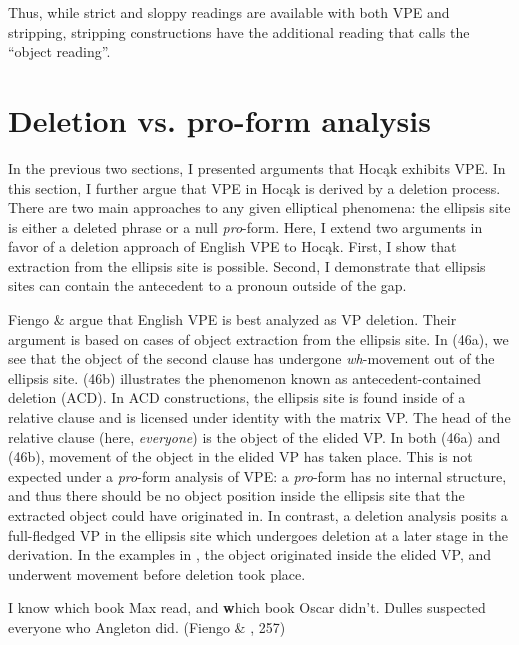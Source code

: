 \documentclass[output=paper]{LSP/langsci}
\begin{document}
Thus, while strict and sloppy readings are available with both VPE and stripping, stripping constructions have the additional reading that \citealt{Fortin2007} calls the ``object reading''.


\section{Deletion vs. pro-form analysis}

In the previous two sections, I presented arguments that Hocąk exhibits VPE. In this section, I further argue that VPE in Hocąk is derived by a deletion process. There are two main approaches to any given elliptical phenomena: the ellipsis site is either a deleted phrase or a null \emph{pro}-form. Here, I extend two arguments in favor of a deletion approach of English VPE to Hocąk. First, I show that extraction from the ellipsis site is possible. Second, I demonstrate that ellipsis sites can contain the antecedent to a pronoun outside of the gap.

Fiengo \& \citet{May1994} argue that English VPE is best analyzed as VP deletion. Their argument is based on cases of object extraction from the ellipsis site. In (46a), we see that the object of the second clause has undergone \emph{wh}-movement out of the ellipsis site. (46b) illustrates the phenomenon known as antecedent-contained deletion (ACD). In ACD constructions, the ellipsis site is found inside of a relative clause and is licensed under identity with the matrix VP. The head of the relative clause (here, \emph{everyone}) is the object of the elided VP. In both (46a) and (46b), movement of the object in the elided VP has taken place. This is not expected under a \emph{pro}-form analysis of VPE: a \emph{pro}-form has no internal structure, and thus there should be no object position inside the ellipsis site that the extracted object could have originated in. In contrast, a deletion analysis posits a full-fledged VP in the ellipsis site which undergoes deletion at a later stage in the derivation. In the examples in , the object originated inside the elided VP, and underwent movement before deletion took place.

\begin{exe}
\ex
\begin{xlist}
\ex
I know which book Max read, and {\textbf which book} Oscar didn't.
\ex
Dulles suspected everyone who Angleton did. (Fiengo \& \citealt[229]{May1994}, 257)
\end{xlist}
\end{exe}
\end{document}
